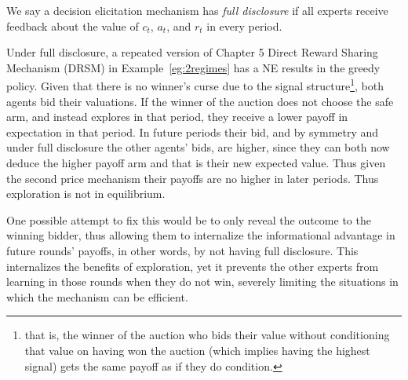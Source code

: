 \begin{defn}
  We say a decision elicitation mechanism has \emph{full disclosure} if all experts receive feedback about the value of $c_t$, $a_t$, and $r_t$ in every period.
 \end{defn}


Under full disclosure, a repeated version of Chapter 5 Direct Reward Sharing  Mechanism (DRSM) in Example~\ref{eg:2regimes} has a NE results in the greedy policy.
Given that there is no winner's curse due to the signal structure\footnote{that is, the winner of the auction who  bids their value without conditioning that value on having won the auction (which implies having the highest signal) gets the same payoff as if they do condition.}, both agents bid their valuations.
If the winner of the auction does not choose the safe arm, and instead explores in that period, they receive a lower payoff in expectation in that period. In future periods their bid, and by symmetry and under full disclosure the other agents' bids, are higher, since they can both now deduce the higher payoff arm and that is their new expected value. Thus given the second price mechanism their payoffs are no higher in later periods. Thus exploration is not in equilibrium. 


One possible attempt to fix this would be to only reveal the outcome to the winning bidder, thus allowing them to internalize the informational advantage in future rounds' payoffs, in other words, by not having full disclosure.
This internalizes the benefits of exploration, yet it prevents the other experts from learning in those rounds when they do not win, severely limiting the situations in which the mechanism can be efficient.




